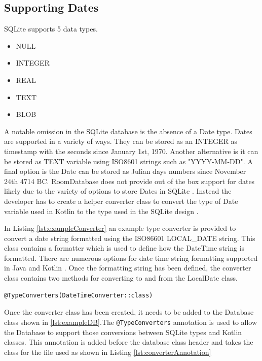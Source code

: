 \documentclass[12pt]{article}
\begin{document}
\subsection{Supporting Dates}


SQLite supports 5 data types. 
\begin{itemize}
\item NULL 
\item INTEGER
\item REAL
\item TEXT
\item BLOB
\end{itemize}
A notable omission in the SQLite database is the absence of a Date type. Dates are supported in a variety of ways. They can be stored as an INTEGER as timestamp with the seconds since January 1st, 1970. Another alternative is it can be stored as TEXT variable using ISO8601 strings such as "YYYY-MM-DD". A final option is the Date can be stored as Julian days numbers since November 24th 4714 BC. RoomDatabase does not provide out of the box support for dates likely due to the variety of options to store Dates in SQLite \cite{SqliteDataTypes}. Instead the developer has to create a helper converter class to convert the type of Date variable used in Kotlin to the type used in the SQLite design \cite{RoomDBTypeConverters}. 

In Listing \ref{lst:exampleConverter} an example type converter is provided to convert a date string formatted using the ISO86601 LOCAL\_DATE string. This class contains a formatter which is used to define how the DateTime string is formatted. There are numerous options for date time string formatting supported in Java and Kotlin \cite{DateTimeFormatterDocs}. Once the formatting string has been defined, the converter class contains two methods for converting to and from the LocalDate class. 

\begin{lstlisting}[numbers=none, 
			caption=Task to generate Dokka documentation,
			label={lst:converterAnnotation}]
@TypeConverters(DateTimeConverter::class)
\end{lstlisting}

Once the converter class has been created, it needs to be added to the Database class shown in \ref{lst:exampleDB}.The \verb|@TypeConverters| annotation is used to allow the Database to support those conversions between SQLite types and Kotlin classes. This annotation is added before the database class header and takes the class for the file used as shown in Listing \ref{lst:converterAnnotation} 
\end{document}
